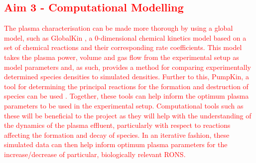 \documentclass[11pt, oneside]{article}   	%
\begin{document}
\textcolor{red}{
\subsection*{Aim 3 - Computational Modelling}
The plasma characterisation can be made more thorough by using a global model, such as GlobalKin \cite{Stafford2004O2}, a 0-dimensional chemical kinetics model based on a set of chemical reactions and their corresponding rate coefficients.
This model takes the plasma power, volume and gas flow from the experimental setup as model parameters and, as such, provides a method for comparing experimentally determined species densities to simulated densities.
Further to this, PumpKin, a tool for determining the principal reactions for the formation and destruction of species can be used \cite{Markosyan2014PumpKin}.
Together, these tools can help inform the optimum plasma parameters to be used in the experimental setup.
Computational tools such as these will be beneficial to the project as they will help with the understanding of the dynamics of the plasma effluent, particularly with respect to reactions affecting the formation and decay of species. In an iterative fashion, these simulated data can then help inform optimum plasma parameters for the increase/decrease of particular, biologically relevant RONS.}




\end{document}
